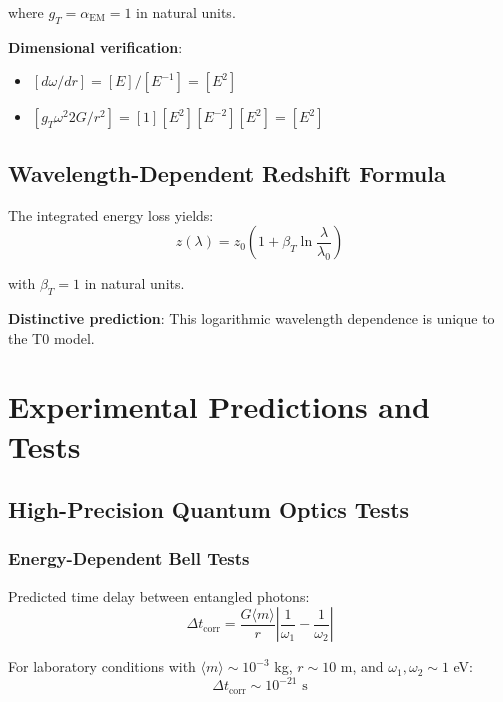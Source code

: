 \documentclass[12pt,a4paper]{article}
\begin{document}
	where $g_T = \alpha_{\text{EM}} = 1$ in natural units.
	
	\textbf{Dimensional verification}:
	\begin{itemize}
		\item $[d\omega/dr] = [E]/[E^{-1}] = [E^2]$
		\item $[g_T \omega^2 2G/r^2] = [1][E^2][E^{-2}][E^2] = [E^2]$ \checkmark
	\end{itemize}
	
	\subsection{Wavelength-Dependent Redshift Formula}
	
	The integrated energy loss yields:
	\begin{equation}
		z(\lambda) = z_0\left(1 + \beta_T \ln\frac{\lambda}{\lambda_0}\right)
		\label{eq:wavelength_dependent_redshift}
	\end{equation}
	
	with $\beta_T = 1$ in natural units.
	
	\textbf{Distinctive prediction}: This logarithmic wavelength dependence is unique to the T0 model.
	
	\section{Experimental Predictions and Tests}
	
	\subsection{High-Precision Quantum Optics Tests}
	
	\subsubsection{Energy-Dependent Bell Tests}
	
	Predicted time delay between entangled photons:
	\begin{equation}
		\Delta t_{\text{corr}} = \frac{G\langle m \rangle}{r} \left|\frac{1}{\omega_1} - \frac{1}{\omega_2}\right|
		\label{eq:correlation_time_delay}
	\end{equation}
	
	For laboratory conditions with $\langle m \rangle \sim 10^{-3}$ kg, $r \sim 10$ m, and $\omega_1,\omega_2 \sim 1$ eV:
	\begin{equation}
		\Delta t_{\text{corr}} \sim 10^{-21} \text{ s}
		\label{eq:laboratory_delay}
	\end{equation}
	
\end{document}
